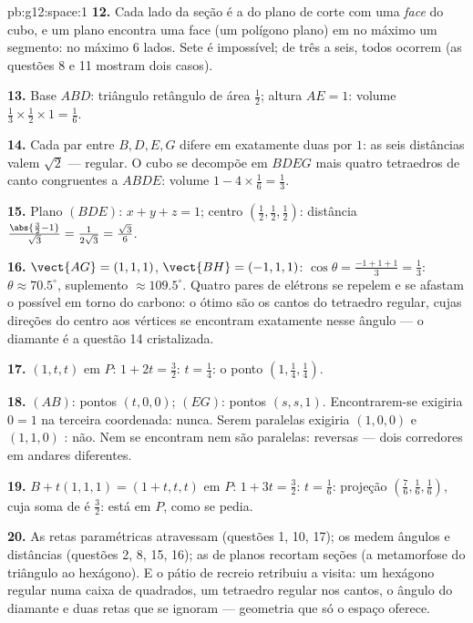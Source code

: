 \begin{solution}{pb:g12:space:1}
\textbf{12.} Cada lado da seção é a  do plano de
corte com uma \emph{face} do cubo, e um plano encontra uma
face (um polígono plano) em no máximo um segmento: no máximo
$6$ lados. Sete é impossível; de três a seis, todos ocorrem
(as questões 8 e 11 mostram dois casos).

\textbf{13.} Base $ABD$: triângulo retângulo de área
$\frac12$; altura $AE = 1$: volume
$\frac13 \times \frac12 \times 1 = \frac16$.

\textbf{14.} Cada par entre $B, D, E, G$ difere em exatamente
duas  por $1$: as seis distâncias valem $\sqrt2$
--- regular. O cubo se decompõe em $BDEG$ mais quatro
tetraedros de canto congruentes a $ABDE$: volume
$1 - 4 \times \frac16 = \frac13$.

\textbf{15.} Plano $(BDE)$: $x + y + z = 1$; centro
$\left(\frac12,\frac12,\frac12\right)$: distância
$\frac{\abs{\frac32 - 1}}{\sqrt3} = \frac{1}{2\sqrt3} =
\frac{\sqrt3}{6}$.

\textbf{16.} $\vect{AG} = (1,1,1)$,
$\vect{BH} = (-1,1,1)$: $\cos\theta = \frac{-1 + 1 + 1}{3} =
\frac13$: $\theta \approx 70.5^\circ$, suplemento
$\approx 109.5^\circ$. Quatro pares de elétrons se repelem e
se afastam o  possível em torno do carbono: o ótimo são
os cantos do tetraedro regular, cujas direções do centro aos
vértices se encontram exatamente nesse ângulo --- o diamante é
a questão 14 cristalizada.

\textbf{17.} $(1, t, t)$ em $P$: $1 + 2t = \frac32$:
$t = \frac14$: o ponto $\left(1, \frac14, \frac14\right)$.

\textbf{18.} $(AB)$: pontos $(t, 0, 0)$; $(EG)$: pontos
$(s, s, 1)$. Encontrarem-se exigiria $0 = 1$ na terceira
coordenada: nunca. Serem paralelas exigiria $(1,0,0)$ e
$(1,1,0)$ : não. Nem se encontram nem são paralelas:
reversas --- dois corredores em andares diferentes.

\textbf{19.} $B + t(1,1,1) = (1 + t, t, t)$ em $P$:
$1 + 3t = \frac32$: $t = \frac16$: projeção
$\left(\frac76, \frac16, \frac16\right)$, cuja soma de
 é $\frac32$: está em $P$, como se pedia.

\textbf{20.} As retas paramétricas atravessam (questões 1, 10,
17); os  medem ângulos e distâncias (questões
2, 8, 15, 16); as  de planos recortam seções (a
metamorfose do triângulo ao hexágono). E o pátio de recreio
retribuiu a visita: um hexágono regular numa caixa de
quadrados, um tetraedro regular nos cantos, o ângulo do
diamante e duas retas que se ignoram --- geometria que só o
espaço oferece.
\end{solution}
